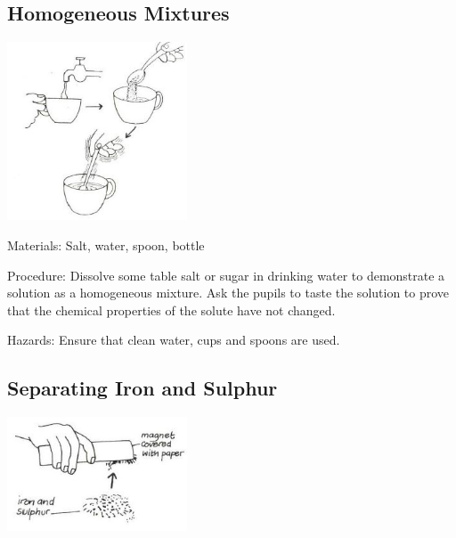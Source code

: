 \begin{multicols}{2}
\subsection{Homogeneous Mixtures}

\begin{center}
\includegraphics[width=0.4\textwidth]{./img/source/homogeneous.jpg}
\end{center}

\begin{description*}
\item[Materials:]{Salt, water, spoon, bottle}
\item[Procedure:]{Dissolve some table salt or sugar in drinking
water to demonstrate a solution as a
homogeneous mixture. Ask the pupils to taste
the solution to prove that the chemical properties
of the solute have not changed.}
\item[Hazards:]{Ensure that clean water, cups and spoons
are used.}
\end{description*}

\subsection{Separating Iron and Sulphur} %

\begin{center}
\includegraphics[width=0.4\textwidth]{./img/vso/iron-sulphur.jpg}
\end{center}


\end{multicols}
